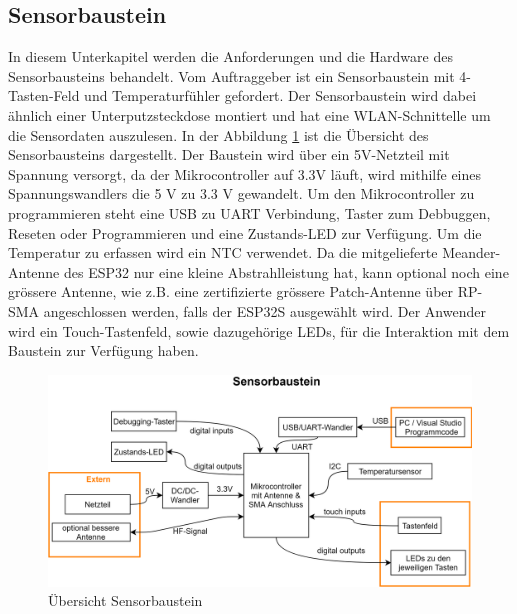 \subsection{Sensorbaustein}\label{subsec: Sensorbaustein}
\label{sec: Sensorbaustein}
In diesem Unterkapitel werden die Anforderungen und die Hardware des Sensorbausteins behandelt.
Vom Auftraggeber ist ein Sensorbaustein mit 4-Tasten-Feld und Temperaturfühler gefordert. Der Sensorbaustein wird dabei ähnlich einer Unterputzsteckdose montiert und hat eine WLAN-Schnittelle um die Sensordaten auszulesen. In der Abbildung \ref{pic: Uebersicht_Sensorbaustein} ist die Übersicht des Sensorbausteins dargestellt. Der Baustein wird über ein 5V-Netzteil mit Spannung versorgt, da der Mikrocontroller auf 3.3V läuft, wird mithilfe eines Spannungswandlers die 5 V zu 3.3 V gewandelt. Um den Mikrocontroller zu programmieren steht eine USB zu UART Verbindung, Taster zum Debbuggen, Reseten oder Programmieren und eine Zustands-LED zur Verfügung. Um die Temperatur zu erfassen wird ein NTC verwendet. Da die mitgelieferte Meander-Antenne des ESP32 nur eine kleine Abstrahlleistung hat, kann optional noch eine grössere Antenne, wie z.B. eine zertifizierte grössere Patch-Antenne über RP-SMA angeschlossen werden, falls der ESP32S ausgewählt wird. Der Anwender wird ein Touch-Tastenfeld, sowie dazugehörige LEDs, für die Interaktion mit dem Baustein zur Verfügung haben.  

\begin{figure}[H]
	\centering
	\includegraphics[width=\textwidth]{graphics/Sensorbaustein.png}
	\caption{Übersicht Sensorbaustein}
	\label{pic: Uebersicht_Sensorbaustein}
\end{figure} 

